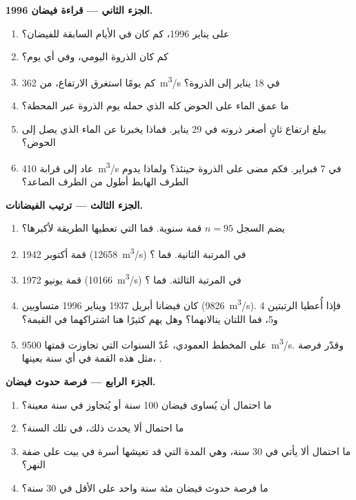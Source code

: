 \begin{problem}
\medskip
\noindent\textbf{الجزء الثاني --- قراءة فيضان 1996.}
\begin{enumerate}[resume]
  \item على  يناير 1996، كم كان  في
        الأيام السابقة للفيضان؟
  \item كم كان  الذروة اليومي، وفي أي يوم؟
  \item كم يومًا استغرق الارتفاع، من \qty{362}{m^3/s} في
        18 يناير إلى الذروة؟
  \item ما عمق الماء على الحوض كله الذي حمله يوم الذروة
        عبر المحطة؟
  \item يبلغ ارتفاع ثانٍ أصغر ذروته في 29 يناير. فماذا يخبرنا عن
        الماء الذي يصل إلى الحوض؟
  \item عاد  إلى قرابة \qty{410}{m^3/s} في 7 فبراير. فكم مضى
        على الذروة حينئذ؟ ولماذا يدوم الطرف الهابط أطول
        من الطرف الصاعد؟
\end{enumerate}

\medskip
\noindent\textbf{الجزء الثالث --- ترتيب الفيضانات.}
\begin{enumerate}[resume]
  \item يضم السجل $n = 95$ قمة سنوية. فما  التي تعطيها
        الطريقة لأكبرها؟
  \item قمة أكتوبر 1942 (\qty{12658}{m^3/s}) في المرتبة الثانية. فما
        ؟
  \item قمة يونيو 1972 (\qty{10166}{m^3/s}) في المرتبة الثالثة. فما ؟
  \item كان فيضانا أبريل 1937 ويناير 1996 متساويين
        (\qty{9826}{m^3/s}). فإذا أُعطيا الرتبتين 4 و5، فما 
        اللتان ينالانهما؟ وهل يهم كثيرًا هنا اشتراكهما في القيمة؟
  \item على المخطط العمودي، عُدّ السنوات التي تجاوزت قمتها
        \qty{9500}{m^3/s}. وقدّر فرصة مثل هذه القمة في أي سنة
        بعينها، .
\end{enumerate}

\medskip
\noindent\textbf{الجزء الرابع --- فرصة حدوث فيضان.}
\begin{enumerate}[resume]
  \item ما احتمال أن يُساوى فيضان  \num{100} سنة أو
        يُتجاوز في سنة معينة؟
  \item ما احتمال ألا يحدث ذلك، في تلك السنة؟
  \item ما احتمال ألا يأتي في \num{30} سنة،
        وهي المدة التي قد تعيشها أسرة في بيت على ضفة النهر؟
  \item ما فرصة حدوث فيضان مئة سنة واحد على الأقل في
        \num{30} سنة؟
\end{enumerate}
\end{problem}
